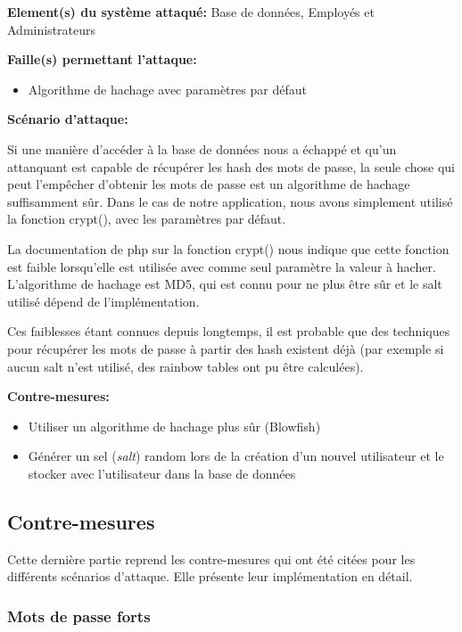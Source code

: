 \documentclass{article}
\begin{document}
\textbf{Element(s) du système attaqué:} Base de données, Employés et
Administrateurs

\textbf{Faille(s) permettant l'attaque:}

\begin{itemize}

\item
  Algorithme de hachage avec paramètres par défaut
\end{itemize}

\textbf{Scénario d'attaque:}

Si une manière d'accéder à la base de données nous a échappé et qu'un
attanquant est capable de récupérer les hash des mots de passe, la seule
chose qui peut l'empêcher d'obtenir les mots de passe est un algorithme
de hachage suffisamment sûr. Dans le cas de notre application, nous
avons simplement utilisé la fonction crypt(), avec les paramètres par
défaut.

La documentation de php sur la fonction crypt() nous indique que cette
fonction est faible lorsqu'elle est utilisée avec comme seul paramètre
la valeur à hacher. L'algorithme de hachage est MD5, qui est connu pour
ne plus être sûr et le salt utilisé dépend de l'implémentation.

Ces faiblesses étant connues depuis longtemps, il est probable que des
techniques pour récupérer les mots de passe à partir des hash existent
déjà (par exemple si aucun salt n'est utilisé, des rainbow tables ont pu
être calculées).

\textbf{Contre-mesures:}

\begin{itemize}

\item
  Utiliser un algorithme de hachage plus sûr (Blowfish)
\item
  Générer un sel (\emph{salt}) random lors de la création d'un nouvel
  utilisateur et le stocker avec l'utilisateur dans la base de données
\end{itemize}

\subsection{Contre-mesures}

Cette dernière partie reprend les contre-mesures qui ont été citées pour
les différents scénarios d'attaque. Elle présente leur implémentation en
détail.

\subsubsection{Mots de passe forts}
\end{document}
